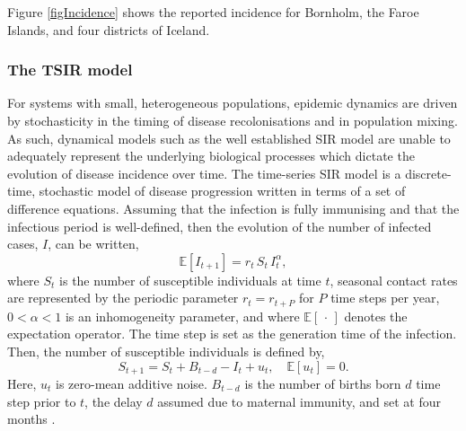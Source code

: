 \documentclass[10pt]{article}
\begin{document}
Figure \ref{figIncidence} shows the reported incidence for Bornholm, the Faroe Islands, and four districts of Iceland.










\subsubsection*{The TSIR model}

For systems with small, heterogeneous populations, epidemic dynamics are driven by stochasticity in the timing of disease recolonisations and in population mixing. As such, dynamical models such as the well established SIR model are unable to adequately represent the underlying biological processes which dictate the evolution of disease incidence over time. The time-series SIR model \cite{Finkenstadt2000} is a discrete-time, stochastic model of disease progression written in terms of a set of difference equations. Assuming that the infection is fully immunising and that the infectious period is well-defined, then the evolution of the number of infected cases, $I$, can be written,
\begin{equation}
\mathbb{E}\left[I_{t+1}\right] = r_t \, S_t \, I_t^\alpha,
\label{TSIR_I}
\end{equation}
where $S_t$ is the number of susceptible individuals at time $t$, seasonal contact rates are represented by the periodic parameter $r_t = r_{t+P}$ for $P$ time steps per year, $0 < \alpha < 1$ is an inhomogeneity parameter, and where $\mathbb{E}\left[\,\cdot\,\right]$ denotes the expectation operator. The time step is set as the generation time of the infection. Then, the number of susceptible individuals is defined by,
\begin{equation}
S_{t+1} = S_t + B_{t-d} - I_t + u_t, \quad \mathbb{E}\left[u_t\right] = 0.
\label{TSIR_S}
\end{equation}
Here, $u_t$ is  zero-mean additive noise. $B_{t-d}$ is the number of births born $d$ time step prior to $t$, the delay $d$ assumed due to maternal immunity, and set at four months \cite{Anderson1991}.
\end{document}
